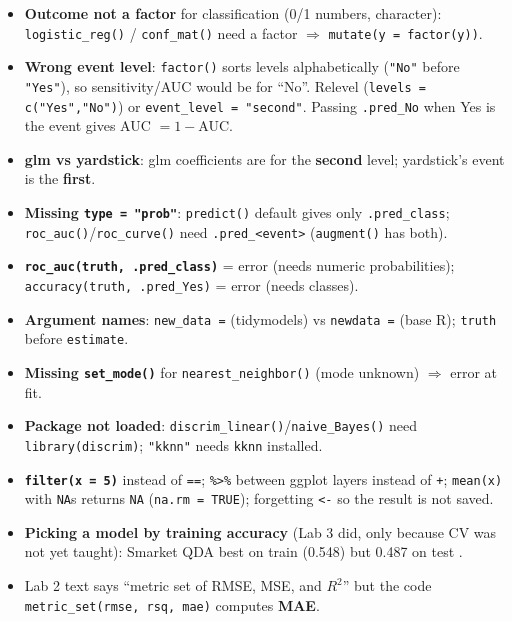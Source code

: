 \begin{trap}
\begin{itemize}
  \texttt{starts\_with("sex")}; \texttt{step\_normalize(all\_predictors())} before \texttt{step\_dummy} hits factor columns;
  impute before anything that uses the column.
\item \textbf{Outcome not a factor} for classification (0/1 numbers, character): \texttt{logistic\_reg()} / \texttt{conf\_mat()}
  need a factor $\Rightarrow$ \texttt{mutate(y = factor(y))}.
\item \textbf{Wrong event level}: \texttt{factor()} sorts levels alphabetically (\texttt{"No"} before \texttt{"Yes"}), so
  sensitivity/AUC would be for ``No''. Relevel (\texttt{levels = c("Yes","No")}) or \texttt{event\_level = "second"}.
  Passing \texttt{.pred\_No} when Yes is the event gives AUC $=1-$AUC.
\item \textbf{glm vs yardstick}: glm coefficients are for the \textbf{second} level; yardstick's event is the \textbf{first}.
\item \textbf{Missing \texttt{type = "prob"}}: \texttt{predict()} default gives only \texttt{.pred\_class};
  \texttt{roc\_auc()}/\texttt{roc\_curve()} need \texttt{.pred\_<event>} (\texttt{augment()} has both).
\item \textbf{\texttt{roc\_auc(truth, .pred\_class)}} = error (needs numeric probabilities); \texttt{accuracy(truth, .pred\_Yes)} = error (needs classes).
\item \textbf{Argument names}: \texttt{new\_data =} (tidymodels) vs \texttt{newdata =} (base R); \texttt{truth} before \texttt{estimate}.
\item \textbf{Missing \texttt{set\_mode()}} for \texttt{nearest\_neighbor()} (mode unknown) $\Rightarrow$ error at fit.
\item \textbf{Package not loaded}: \texttt{discrim\_linear()}/\texttt{naive\_Bayes()} need \texttt{library(discrim)}; \texttt{"kknn"} needs \texttt{kknn} installed.
\item \textbf{\texttt{filter(x = 5)}} instead of \texttt{==}; \texttt{\%>\%} between ggplot layers instead of \texttt{+};
  \texttt{mean(x)} with \texttt{NA}s returns \texttt{NA} (\texttt{na.rm = TRUE}); forgetting \texttt{<-} so the result is not saved.
\item \textbf{Picking a model by training accuracy} (Lab 3 did, only because CV was not yet taught): Smarket QDA best on
  train (0.548) but 0.487 on test .
\item Lab 2 text says ``metric set of RMSE, MSE, and $R^2$'' but the code \texttt{metric\_set(rmse, rsq, mae)} computes \textbf{MAE}.
\end{itemize}
\end{trap}
